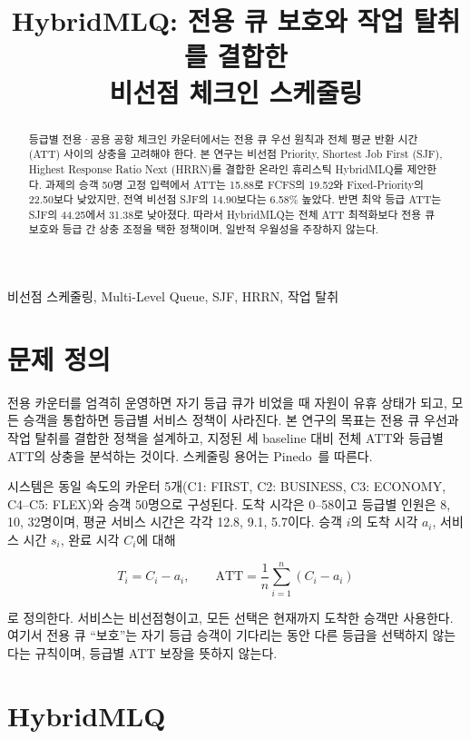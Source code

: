 \documentclass[conference]{IEEEtran}
\title{HybridMLQ: 전용 큐 보호와 작업 탈취를 결합한\\
비선점 체크인 스케줄링}
\author{}
\begin{document}
\maketitle
\suppressfloats[t]

\begin{abstract}
등급별 전용·공용 공항 체크인 카운터에서는 전용 큐 우선 원칙과 전체 평균
반환 시간(ATT) 사이의 상충을 고려해야 한다. 본 연구는 비선점 Priority,
Shortest Job First (SJF), Highest Response Ratio Next (HRRN)를 결합한
온라인 휴리스틱 HybridMLQ를 제안한다. 과제의 승객 50명 고정 입력에서 ATT는
15.88로 FCFS의 19.52와 Fixed-Priority의 22.50보다 낮았지만, 전역 비선점
SJF의 14.90보다는 6.58\% 높았다. 반면 최악 등급 ATT는 SJF의 44.25에서
31.38로 낮아졌다. 따라서 HybridMLQ는 전체 ATT 최적화보다 전용 큐 보호와
등급 간 상충 조정을 택한 정책이며, 일반적 우월성을 주장하지 않는다.
\end{abstract}

\begin{IEEEkeywords}
비선점 스케줄링, Multi-Level Queue, SJF, HRRN, 작업 탈취
\end{IEEEkeywords}

\section{문제 정의}

전용 카운터를 엄격히 운영하면 자기 등급 큐가 비었을 때 자원이 유휴 상태가
되고, 모든 승객을 통합하면 등급별 서비스 정책이 사라진다. 본 연구의 목표는
전용 큐 우선과 작업 탈취를 결합한 정책을 설계하고, 지정된 세 baseline 대비
전체 ATT와 등급별 ATT의 상충을 분석하는 것이다. 스케줄링 용어는
Pinedo~\cite{pinedo}를 따른다.

시스템은 동일 속도의 카운터 5개(C1: FIRST, C2: BUSINESS, C3: ECONOMY,
C4--C5: FLEX)와 승객 50명으로 구성된다. 도착 시각은 0--58이고 등급별
인원은 8, 10, 32명이며, 평균 서비스 시간은 각각 12.8, 9.1, 5.7이다.
승객 $i$의 도착 시각 $a_i$, 서비스 시간 $s_i$, 완료 시각 $C_i$에 대해

\begin{equation}
T_i=C_i-a_i, \qquad
\mathrm{ATT}=\frac{1}{n}\sum_{i=1}^{n}(C_i-a_i)
\label{eq:att}
\end{equation}

로 정의한다. 서비스는 비선점형이고, 모든 선택은 현재까지 도착한 승객만
사용한다. 여기서 전용 큐 ``보호''는 자기 등급 승객이 기다리는 동안 다른
등급을 선택하지 않는다는 규칙이며, 등급별 ATT 보장을 뜻하지 않는다.

\section{HybridMLQ}
\end{document}
